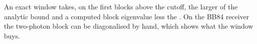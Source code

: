 
An exact window takes, on the first blocks above the cutoff, the larger of
the analytic bound and a computed block eigenvalue less the
. On the BB84 receiver the two-photon block can be
diagonalised by hand, which shows what the window buys.

